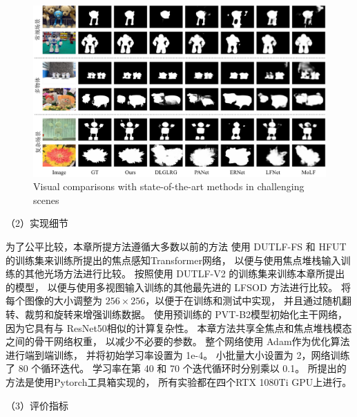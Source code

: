 \begin{figure}[!ht]
	\centering
	\includegraphics[width=\linewidth]{figures/chapter3/compare_1}
	{Visual comparisons with state-of-the-art methods in challenging scenes}
	\label{figure:figure_comparison_1}
\end{figure}






（2）实现细节



为了公平比较，本章所提方法遵循大多数以前的方法
使用 DUTLF-FS 和 HFUT 的训练集来训练所提出的焦点感知Transformer网络，
以便与使用焦点堆栈输入训练的其他光场方法进行比较。 
按照使用 DUTLF-V2 的训练集来训练本章所提出的模型，
以便与使用多视图输入训练的其他最先进的 LFSOD 方法进行比较。 
将每个图像的大小调整为 $256 \times 256$，以便于在训练和测试中实现，
并且通过随机翻转、裁剪和旋转来增强训练数据。
使用预训练的 PVT-B2模型初始化主干网络，
因为它具有与 ResNet50相似的计算复杂性。 
本章方法共享全焦点和焦点堆栈模态之间的骨干网络权重，
以减少不必要的参数。 
整个网络使用 Adam作为优化算法进行端到端训练，
并将初始学习率设置为 1e-4。 
小批量大小设置为 2，网络训练了 80 个循环迭代。 学习率在第 40 和 70 个迭代循环时分别乘以 0.1。 
所提出的方法是使用Pytorch工具箱实现的，
所有实验都在四个RTX 1080Ti GPU上进行。 



（3）评价指标



